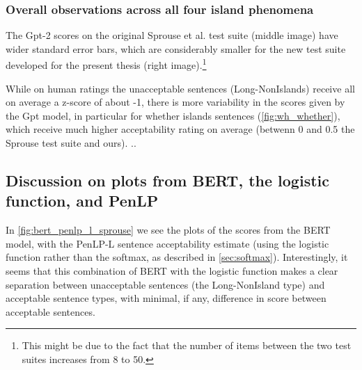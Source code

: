\subsubsection{Overall observations across all four island phenomena}

The Gpt-2 scores on the original Sprouse et al. test suite (middle image) have wider standard error bars, which are considerably smaller for the new test suite developed for the present thesis (right image).\footnote{This might be due to the fact that the number of items between the two test suites increases from 8 to 50.}


While on human ratings the unacceptable sentences (Long-NonIslands) receive all on average a z-score of about -1, there is more variability in the scores given by the Gpt model, in particular for whether islands sentences (\autoref{fig:wh_whether}), which receive much higher acceptability rating on average (betwenn 0 and 0.5 the Sprouse test suite and ours).
..







\subsection{Discussion on plots from BERT, the logistic function, and PenLP}


In \autoref{fig:bert_penlp_l_sprouse} we see the plots of the scores from the BERT model, with the PenLP-L sentence acceptability estimate (using the logistic function rather than the softmax, as described in \autoref{sec:softmax}). Interestingly, it seems that this combination of BERT with the logistic function makes a clear separation between unacceptable sentences (the Long-NonIsland type) and acceptable sentence types, with minimal, if any, difference in score between acceptable sentences.

